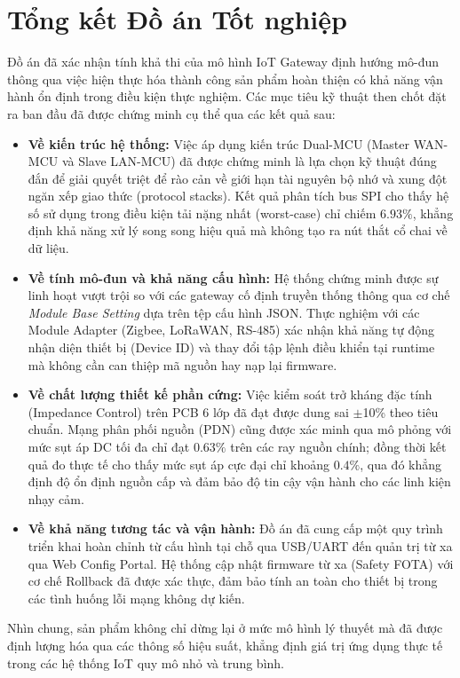 \section{Tổng kết Đồ án Tốt nghiệp}
Đồ án đã xác nhận tính khả thi của mô hình IoT Gateway định hướng mô-đun thông qua việc hiện thực hóa thành công sản phẩm hoàn thiện có khả năng vận hành ổn định trong điều kiện thực nghiệm. Các mục tiêu kỹ thuật then chốt đặt ra ban đầu đã được chứng minh cụ thể qua các kết quả sau:

\begin{itemize}
    \item \textbf{Về kiến trúc hệ thống:} Việc áp dụng kiến trúc Dual-MCU (Master WAN-MCU và Slave LAN-MCU) đã được chứng minh là lựa chọn kỹ thuật đúng đắn để giải quyết triệt để rào cản về giới hạn tài nguyên bộ nhớ và xung đột ngăn xếp giao thức (protocol stacks). Kết quả phân tích bus SPI cho thấy hệ số sử dụng trong điều kiện tải nặng nhất (worst-case) chỉ chiếm $6{.}93\%$, khẳng định khả năng xử lý song song hiệu quả mà không tạo ra nút thắt cổ chai về dữ liệu.
    
    \item \textbf{Về tính mô-đun và khả năng cấu hình:} Hệ thống chứng minh được sự linh hoạt vượt trội so với các gateway cố định truyền thống thông qua cơ chế \textit{Module Base Setting} dựa trên tệp cấu hình JSON. Thực nghiệm với các Module Adapter (Zigbee, LoRaWAN, RS-485) xác nhận khả năng tự động nhận diện thiết bị (Device ID) và thay đổi tập lệnh điều khiển tại runtime mà không cần can thiệp mã nguồn hay nạp lại firmware.
    
    \item \textbf{Về chất lượng thiết kế phần cứng:} Việc kiểm soát trở kháng đặc tính (Impedance Control) trên PCB 6 lớp đã đạt được dung sai $\pm$10\% theo tiêu chuẩn. Mạng phân phối nguồn (PDN) cũng được xác minh qua mô phỏng với mức sụt áp DC tối đa chỉ đạt $0{.}63\%$ trên các ray nguồn chính; đồng thời kết quả đo thực tế cho thấy mức sụt áp cực đại chỉ khoảng $0{.}4\%$, qua đó khẳng định độ ổn định nguồn cấp và đảm bảo độ tin cậy vận hành cho các linh kiện nhạy cảm.
    
    \item \textbf{Về khả năng tương tác và vận hành:} Đồ án đã cung cấp một quy trình triển khai hoàn chỉnh từ cấu hình tại chỗ qua USB/UART đến quản trị từ xa qua Web Config Portal. Hệ thống cập nhật firmware từ xa (Safety FOTA) với cơ chế Rollback đã được xác thực, đảm bảo tính an toàn cho thiết bị trong các tình huống lỗi mạng không dự kiến.
\end{itemize}

Nhìn chung, sản phẩm không chỉ dừng lại ở mức mô hình lý thuyết mà đã được định lượng hóa qua các thông số hiệu suất, khẳng định giá trị ứng dụng thực tế trong các hệ thống IoT quy mô nhỏ và trung bình.